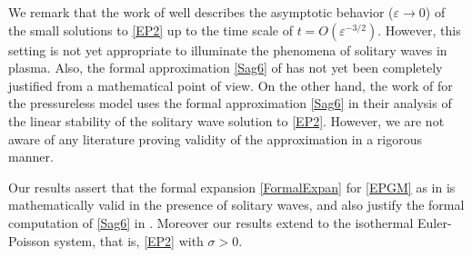 \documentclass{amsart}
\newcommand{\veps}{\varepsilon}
\numberwithin{equation}{section}
\theoremstyle{plain}%
\theoremstyle{definition}
\theoremstyle{remark}
\theoremstyle{remark}
\begin{document}
We remark that the work of \cite{Guo} well describes the asymptotic behavior ($\veps\to0$) of the small solutions to \eqref{EP2} up to the time scale of $t=O(\veps^{-3/2})$. 
However, this setting is not yet appropriate to illuminate  the phenomena of solitary waves in plasma.
Also, the formal approximation \eqref{Sag6} of \cite{Sag} has not yet been completely justified from a mathematical point of view. On the other hand, the work of \cite{Sche} for the pressureless model %
 uses the formal approximation \eqref{Sag6} in their analysis of the linear stability of the solitary wave solution to \eqref{EP2}. However, we are not aware of any literature proving validity of the approximation in a rigorous manner.

%
Our results  assert that    the  formal expansion \eqref{FormalExpan} for \eqref{EPGM} as in \cite{Wa} is mathematically valid in the presence of solitary waves, and also justify the formal computation of \eqref{Sag6} in \cite{Sag}. Moreover our results extend 
 to the isothermal Euler-Poisson system, that is, \eqref{EP2} with $\sigma > 0$.
\end{document}
